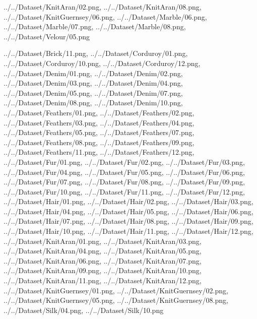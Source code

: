 \documentclass[12pt,a4paper]{article}
\begin{document}
\begin{singlespace}
{../../Dataset/KnitAran/02.png,
../../Dataset/KnitAran/08.png,
../../Dataset/KnitGuernsey/06.png,
../../Dataset/Marble/06.png,
../../Dataset/Marble/07.png,
../../Dataset/Marble/08.png,
../../Dataset/Velour/05.png}

{../../Dataset/Brick/11.png,
../../Dataset/Corduroy/01.png,
../../Dataset/Corduroy/10.png,
../../Dataset/Corduroy/12.png,
../../Dataset/Denim/01.png,
../../Dataset/Denim/02.png,
../../Dataset/Denim/03.png,
../../Dataset/Denim/04.png,
../../Dataset/Denim/05.png,
../../Dataset/Denim/07.png,
../../Dataset/Denim/08.png,
../../Dataset/Denim/10.png,
../../Dataset/Feathers/01.png,
../../Dataset/Feathers/02.png,
../../Dataset/Feathers/03.png,
../../Dataset/Feathers/04.png,
../../Dataset/Feathers/05.png,
../../Dataset/Feathers/07.png,
../../Dataset/Feathers/08.png,
../../Dataset/Feathers/09.png,
../../Dataset/Feathers/11.png,
../../Dataset/Feathers/12.png,
../../Dataset/Fur/01.png,
../../Dataset/Fur/02.png,
../../Dataset/Fur/03.png,
../../Dataset/Fur/04.png,
../../Dataset/Fur/05.png,
../../Dataset/Fur/06.png,
../../Dataset/Fur/07.png,
../../Dataset/Fur/08.png,
../../Dataset/Fur/09.png,
../../Dataset/Fur/10.png,
../../Dataset/Fur/11.png,
../../Dataset/Fur/12.png,
../../Dataset/Hair/01.png,
../../Dataset/Hair/02.png,
../../Dataset/Hair/03.png,
../../Dataset/Hair/04.png,
../../Dataset/Hair/05.png,
../../Dataset/Hair/06.png,
../../Dataset/Hair/07.png,
../../Dataset/Hair/08.png,
../../Dataset/Hair/09.png,
../../Dataset/Hair/10.png,
../../Dataset/Hair/11.png,
../../Dataset/Hair/12.png,
../../Dataset/KnitAran/01.png,
../../Dataset/KnitAran/03.png,
../../Dataset/KnitAran/04.png,
../../Dataset/KnitAran/05.png,
../../Dataset/KnitAran/06.png,
../../Dataset/KnitAran/07.png,
../../Dataset/KnitAran/09.png,
../../Dataset/KnitAran/10.png,
../../Dataset/KnitAran/11.png,
../../Dataset/KnitAran/12.png,
../../Dataset/KnitGuernsey/01.png,
../../Dataset/KnitGuernsey/02.png,
../../Dataset/KnitGuernsey/05.png,
../../Dataset/KnitGuernsey/08.png,
../../Dataset/Silk/04.png,
../../Dataset/Silk/10.png}


\end{singlespace}
\end{document}
